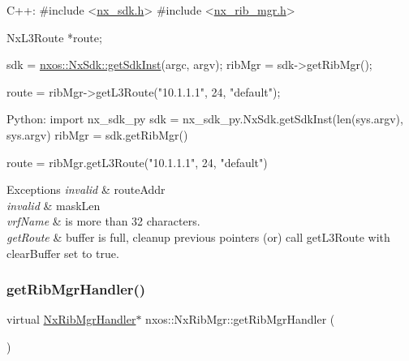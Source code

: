 \begin{DoxyCode}
C++:
\textcolor{preprocessor}{     #include <\mbox{\hyperlink{nx__sdk_8h}{nx\_sdk.h}}>}
\textcolor{preprocessor}{     #include <\mbox{\hyperlink{nx__rib__mgr_8h}{nx\_rib\_mgr.h}}>}

     NxL3Route    *route;

     sdk = \mbox{\hyperlink{classnxos_1_1_nx_sdk_a5050e2d26c40744b4fc7862068a83f39}{nxos::NxSdk::getSdkInst}}(argc, argv);
     ribMgr = sdk->getRibMgr();

     route = ribMgr->getL3Route(\textcolor{stringliteral}{"10.1.1.1"}, 24, \textcolor{stringliteral}{"default"});

Python:
     \textcolor{keyword}{import} nx\_sdk\_py
     sdk = nx\_sdk\_py.NxSdk.getSdkInst(len(sys.argv), sys.argv)
     ribMgr = sdk.getRibMgr()

     route = ribMgr.getL3Route(\textcolor{stringliteral}{"10.1.1.1"}, 24, \textcolor{stringliteral}{"default"})
\end{DoxyCode}



\begin{DoxyExceptions}{Exceptions}
{\em invalid} & route\+Addr \\
\hline
{\em invalid} & mask\+Len \\
\hline
{\em vrf\+Name} & is more than 32 characters. \\
\hline
{\em get\+Route} & buffer is full, cleanup previous pointers (or) call get\+L3\+Route with clear\+Buffer set to true. \\
\hline
\end{DoxyExceptions}
\mbox{\label{classnxos_1_1_nx_rib_mgr_aeed917ba912782303662c4009f3fcfcd}} 
\subsubsection{\texorpdfstring{get\+Rib\+Mgr\+Handler()}{getRibMgrHandler()}}
{\footnotesize\ttfamily virtual \mbox{\hyperlink{classnxos_1_1_nx_rib_mgr_handler}{Nx\+Rib\+Mgr\+Handler}}$\ast$ nxos\+::\+Nx\+Rib\+Mgr\+::get\+Rib\+Mgr\+Handler (\begin{DoxyParamCaption}{ }\end{DoxyParamCaption})\hspace{0.3cm}{\ttfamily [pure virtual]}}

